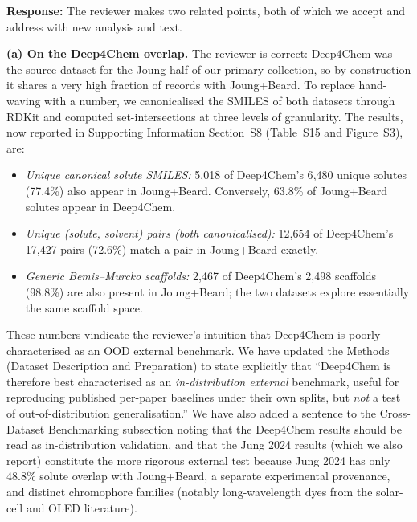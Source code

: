 \documentclass[11pt]{article}
\newcommand{\response}[1]{\noindent\textbf{Response:} #1\par\medskip}
\begin{document}
\response{The reviewer makes two related points, both of which we accept and address with new analysis and text.

\textbf{(a) On the Deep4Chem overlap.} The reviewer is correct: Deep4Chem was the source dataset for the Joung half of our primary collection, so by construction it shares a very high fraction of records with Joung+Beard. To replace hand-waving with a number, we canonicalised the SMILES of both datasets through RDKit and computed set-intersections at three levels of granularity. The results, now reported in Supporting Information Section~S8 (Table~S15 and Figure~S3), are:
\begin{itemize}[leftmargin=2em,itemsep=2pt]
  \item \emph{Unique canonical solute SMILES:} 5{,}018 of Deep4Chem's 6{,}480 unique solutes (77.4\%) also appear in Joung+Beard. Conversely, 63.8\% of Joung+Beard solutes appear in Deep4Chem.
  \item \emph{Unique (solute, solvent) pairs (both canonicalised):} 12{,}654 of Deep4Chem's 17{,}427 pairs (72.6\%) match a pair in Joung+Beard exactly.
  \item \emph{Generic Bemis--Murcko scaffolds:} 2{,}467 of Deep4Chem's 2{,}498 scaffolds (98.8\%) are also present in Joung+Beard; the two datasets explore essentially the same scaffold space.
\end{itemize}
These numbers vindicate the reviewer's intuition that Deep4Chem is poorly characterised as an OOD external benchmark. We have updated the Methods (Dataset Description and Preparation) to state explicitly that ``Deep4Chem is therefore best characterised as an \emph{in-distribution external} benchmark, useful for reproducing published per-paper baselines under their own splits, but \emph{not} a test of out-of-distribution generalisation.'' We have also added a sentence to the Cross-Dataset Benchmarking subsection noting that the Deep4Chem results should be read as in-distribution validation, and that the Jung 2024 results (which we also report) constitute the more rigorous external test because Jung 2024 has only 48.8\% solute overlap with Joung+Beard, a separate experimental provenance, and distinct chromophore families (notably long-wavelength dyes from the solar-cell and OLED literature).

}
\end{document}
